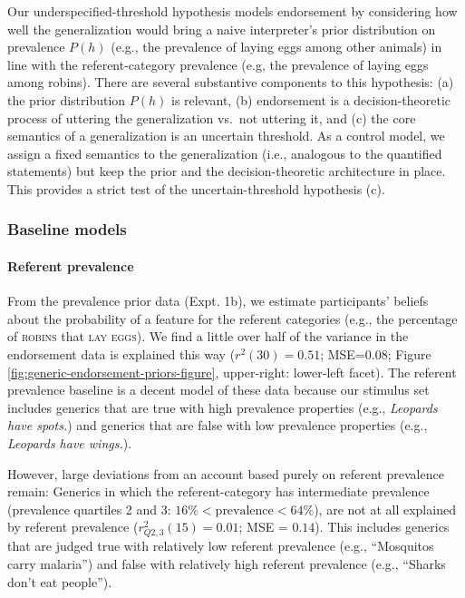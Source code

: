 \documentclass[english,floatsintext,man]{apa6}
\theoremstyle{definition}
\theoremstyle{definition}
\theoremstyle{definition}
\theoremstyle{remark}
\begin{document}
Our underspecified-threshold hypothesis models endorsement by
considering how well the generalization would bring a naive
interpreter's prior distribution on prevalence \(P(h)\) (e.g., the
prevalence of laying eggs among other animals) in line with the
referent-category prevalence (e.g, the prevalence of laying eggs among
robins). There are several substantive components to this hypothesis:
(a) the prior distribution \(P(h)\) is relevant, (b) endorsement is a
decision-theoretic process of uttering the generalization vs.~not
uttering it, and (c) the core semantics of a generalization is an
uncertain threshold. As a control model, we assign a fixed semantics to
the generalization (i.e., analogous to the quantified statements) but
keep the prior and the decision-theoretic architecture in place. This
provides a strict test of the uncertain-threshold hypothesis (c).

\subsubsection{Baseline models}\label{baseline-models}

\paragraph{Referent prevalence}\label{referent-prevalence}

From the prevalence prior data (Expt. 1b), we estimate participants'
beliefs about the probability of a feature for the referent categories
(e.g., the percentage of \textsc{robins} that \textsc{lay eggs}). We
find a little over half of the variance in the endorsement data is
explained this way (\(r^2(30) = 0.51\); MSE=\(0.08\); Figure ~
\ref{fig:generic-endorsement-priors-figure}, upper-right: lower-left
facet). The referent prevalence baseline is a decent model of these data
because our stimulus set includes generics that are true with high
prevalence properties (e.g., \emph{Leopards have spots.}) and generics
that are false with low prevalence properties (e.g., \emph{Leopards have
wings.}).

However, large deviations from an account based purely on referent
prevalence remain: Generics in which the referent-category has
intermediate prevalence (prevalence quartiles 2 and 3:
\(16\% < \text{prevalence} < 64\%\)), are not at all explained by
referent prevalence (\(r_{Q2,3}^2(15) = 0.01\); MSE = \(0.14\)). This
includes generics that are judged true with relatively low referent
prevalence (e.g., \enquote{Mosquitos carry malaria}) and false with
relatively high referent prevalence (e.g., \enquote{Sharks don't eat
people}).
\end{document}
